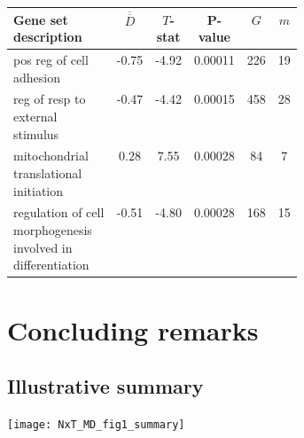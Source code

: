 \documentclass[a0,portrait]{a0poster}
\newcommand*{\barbar}[1]{\overline{\overline{#1}}}
\begin{document}
\begin{multicols}{3}
\begin{tabular} {>{\raggedright}p{0.375\linewidth} | c | c | c |c |c}
   Gene set description & $\barbar{D}$ & $T$-stat & P-value & $G$ & $m$ \\
    \hline \hline
   pos reg of cell adhesion & -0.75 & -4.92 & 0.00011 & 226 & 19 \\
   \hline
   reg of resp to external stimulus & -0.47 & -4.42 & 0.00015 & 458 & 28 \\
   \hline
   mitochondrial translational initiation & \phantom{-}0.28 & \phantom{-}7.55 & 0.00028 & 84 & 7 \\
   \hline
   regulation of cell morphogenesis involved in differentiation & -0.51 & -4.80 & 0.00028 & 168 & 15 \\
   \hline
   \end{tabular}


\color{Black} %

\section{Concluding remarks}

\subsection{Illustrative summary}
\begin{center}\vspace{1cm}
\texttt{[image: NxT\_MD\_fig1\_summary]}
\end{center}\vspace{1cm}



\end{multicols}
\end{document}

